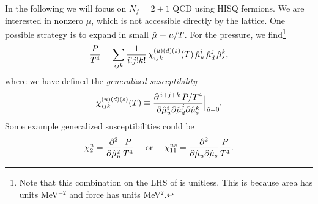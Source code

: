 In the following we will focus on $N_f=2+1$ QCD using HISQ fermions. We are
interested in nonzero $\mu$, which is not accessible directly by the lattice.
One possible strategy is to expand in small $\hat{\mu}\equiv\mu/T$. For the
pressure, we find\footnote{Note that this combination on the LHS of 
 is unitless. This is because area has units
MeV$^{-2}$ and force has units MeV$^2$.}
\begin{equation}\label{eq:pxpac}
\frac{P}{T^4}=\sum_{ijk}\frac{1}{i!j!k!}\,\chi_{ijk}^{(u)(d)(s)}(T)\,
               \hat{\mu}_u^i\,\hat{\mu}_d^j\,\hat{\mu}_s^k,
\end{equation}
where we have defined the {\it generalized
susceptibility}
\begin{equation}
\chi_{ijk}^{(u)(d)(s)}(T)
  \equiv\frac{\partial^{\,i+j+k}\,P/T^4}{\partial\hat{\mu}_u^i\partial\hat{\mu}_d^j
                                       \partial\hat{\mu}_s^k}\Big|_{\hat{\mu}=0}.
\end{equation}
Some example generalized susceptibilities could be
\begin{equation}
  \chi_2^u=\frac{\partial^2}{\partial\hat{\mu}_u^2}\frac{P}{T^4}
  ~~~~\text{or}~~~~
  \chi_{11}^{us}=\frac{\partial^2}{\partial\hat{\mu}_u\partial\hat{\mu}_s}\frac{P}{T^4}.
\end{equation}

